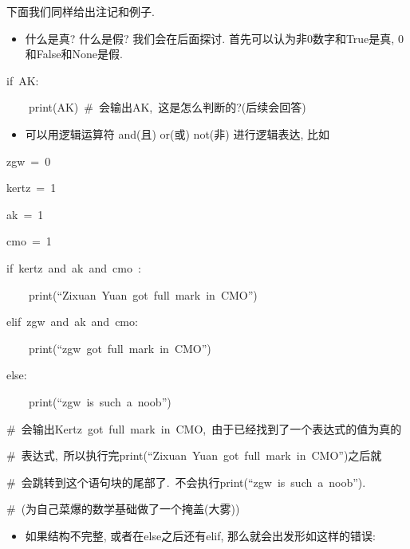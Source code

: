 下面我们同样给出注记和例子.
\begin{itemize}
\item 什么是真? 什么是假? 我们会在后面探讨. 首先可以认为非0数字和True是真, 0和False和None是假. 
\end{itemize}
\begin{lyxcode}
if~\textquotedbl AK\textquotedbl :

~~~~print(\textquotedbl AK\textquotedbl )~\#~会输出AK,~这是怎么判断的?(后续会回答)
\end{lyxcode}
\begin{itemize}
\item 可以用逻辑运算符 and(且) or(或) not(非) 进行逻辑表达, 比如
\end{itemize}
\begin{lyxcode}
zgw~=~0

kertz~=~1

ak~=~1

cmo~=~1

if~kertz~and~ak~and~cmo~:

~~~~print(``Zixuan~Yuan~got~full~mark~in~CMO'')

elif~zgw~and~ak~and~cmo:

~~~~print(``zgw~got~full~mark~in~CMO'')

else:

~~~~print(``zgw~is~such~a~noob'')

\#~会输出Kertz~got~full~mark~in~CMO,~由于已经找到了一个表达式的值为真的

\#~表达式,~所以执行完print(``Zixuan~Yuan~got~full~mark~in~CMO'')之后就

\#~会跳转到这个语句块的尾部了.~不会执行print(``zgw~is~such~a~noob'').

\#~(为自己菜爆的数学基础做了一个掩盖(大雾))
\end{lyxcode}
\begin{itemize}
\item 如果结构不完整, 或者在else之后还有elif, 那么就会出发形如这样的错误:
\end{itemize}
